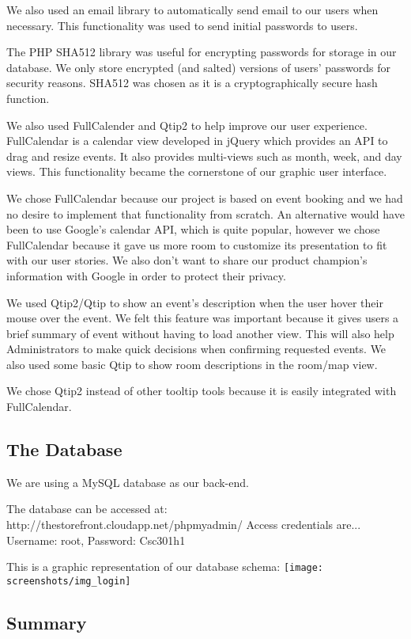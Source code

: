 \documentclass[12pt]{article}
\begin{document}
We also used an email library to automatically send email to our users when necessary. This functionality was used to send initial passwords to users.

The PHP SHA512 library was useful for encrypting passwords for storage in our database. We only store encrypted (and salted) versions of users’ passwords for security reasons. SHA512 was chosen as it is a cryptographically secure hash function.

We also used FullCalender and Qtip2 to help improve our user experience. FullCalendar is a calendar view developed in jQuery which provides an API to drag and resize events. It also provides multi-views such as month, week, and day views. This functionality became the cornerstone of our graphic user interface.

We chose FullCalendar because our project is based on event booking and we had no desire to implement that functionality from scratch. An alternative would have been to use Google's calendar API, which is quite popular, however we chose FullCalendar because it gave us more room to customize its presentation to fit with our user stories. We also don’t want to share our product champion’s information with Google in order to protect their privacy.

We used Qtip2/Qtip to show an event’s description when the user hover their mouse over the event. We felt this feature was important because it gives users a brief summary of event without having to load another view. This will also help Administrators to make quick decisions when confirming requested events. We also used some basic Qtip to show room descriptions in the room/map view.

We chose Qtip2 instead of other tooltip tools because it is easily integrated with FullCalendar.


\subsection{The Database}

We are using a MySQL database as our back-end.

The database can be accessed at: http://thestorefront.cloudapp.net/phpmyadmin/ \newline
Access credentials are... Username: root, Password: Csc301h1

This is a graphic representation of our database schema:
\texttt{[image: screenshots/img\_login]}


\subsection{Summary}
\end{document}
